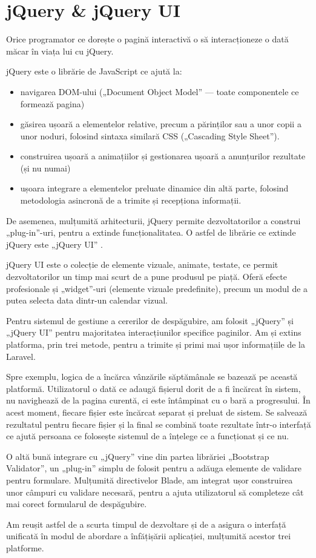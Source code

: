 \section{jQuery \& jQuery UI}

	Orice programator ce dorește o pagină interactivă o să interacționeze o dată măcar în viața lui cu jQuery.\cite{jquery}

	jQuery este o librărie de JavaScript ce ajută la:
	\begin{itemize}
		\item navigarea DOM-ului („Document Object Model” --- toate componentele ce formează pagina)
		\item găsirea ușoară a elementelor relative, precum a părinților sau a unor copii a unor noduri, folosind sintaxa similară CSS („Cascading Style Sheet”).
		\item construirea ușoară a animațiilor și gestionarea ușoară a anunțurilor rezultate (și nu numai)
		\item ușoara integrare a elementelor preluate dinamice din altă parte, folosind metodologia asincronă de a trimite și recepționa informații.
	\end{itemize}

	De asemenea, mulțumită arhitecturii, jQuery permite dezvoltatorilor a construi „plug-in”-uri, pentru a extinde funcționalitatea.
	O astfel de librărie ce extinde jQuery este „jQuery UI” \cite{jquery_ui}.

	jQuery UI este o colecție de elemente vizuale, animate, testate, ce permit dezvoltatorilor un timp mai scurt de a pune produsul pe piață.
	Oferă efecte profesionale și „widget”-uri (elemente vizuale predefinite), precum un modul de a putea selecta data dintr-un calendar vizual.

	Pentru sistemul de gestiune a cererilor de despăgubire, am folosit „jQuery” și „jQuery UI” pentru majoritatea interacțiunilor specifice paginilor.
	Am și extins platforma, prin trei metode, pentru a trimite și primi mai ușor informațiile de la Laravel.

	Spre exemplu, logica de a încărca vânzările săptămânale se bazează pe această platformă.
	Utilizatorul o dată ce adaugă fișierul dorit de a fi încărcat în sistem, nu navighează de la pagina curentă, ci este întâmpinat cu o bară a progresului.
	În acest moment, fiecare fișier este încărcat separat și preluat de sistem.
	Se salvează rezultatul pentru fiecare fișier și la final se combină toate rezultate într-o interfață ce ajută persoana ce folosește sistemul de a înțelege ce a funcționat și ce nu.

	O altă bună integrare cu „jQuery” vine din partea librăriei „Bootstrap Validator”, un „plug-in” simplu de folosit pentru a adăuga elemente de validare pentru formulare. \cite{boostrap_validator}
	Mulțumită directivelor Blade, am integrat ușor construirea unor câmpuri cu validare necesară, pentru a ajuta utilizatorul să completeze cât mai corect formularul de despăgubire.

	Am reușit astfel de a scurta timpul de dezvoltare și de a asigura o interfață unificată în modul de abordare a înfățișării aplicației, mulțumită acestor trei platforme.
